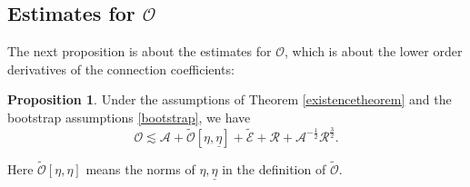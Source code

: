 \documentclass[11pt,reqno]{amsart}
\theoremstyle{definition}
\newtheorem{proposition}{Proposition}[section]
\numberwithin{equation}{section}
\def\etab{\underline{\eta}}
\begin{document}
\subsection{Estimates for $\mathcal{O}$}
The next proposition is about the estimates for $\mathcal{O}$, which is about the lower order derivatives of the connection coefficients:
\begin{proposition}\label{estimate-O}
Under the assumptions of Theorem \ref{existencetheorem} and the bootstrap assumptions \eqref{bootstrap}, we have $$\mathcal{O}\lesssim \mathcal{A}+\widetilde{\mathcal{O}}[\eta,\etab]+\widetilde{\mathcal{E}}+\mathcal{R}+\mathcal{A}^{-\frac{1}{2}}\mathcal{R}^{\frac{3}{2}}.$$
\end{proposition}
Here $\widetilde{\mathcal{O}}[\eta,\eta]$ means the norms of $\eta,\etab$ in the definition of $\widetilde{\mathcal{O}}$.
\end{document}
